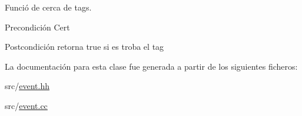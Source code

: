 Funció de cerca de tags. 

\begin{DoxyPrecond}{Precondición}
Cert 
\end{DoxyPrecond}
\begin{DoxyPostcond}{Postcondición}
retorna true si es troba el tag 
\end{DoxyPostcond}


La documentación para esta clase fue generada a partir de los siguientes ficheros\+:\begin{DoxyCompactItemize}
\item 
src/\hyperlink{event_8hh}{event.\+hh}\item 
src/\hyperlink{event_8cc}{event.\+cc}\end{DoxyCompactItemize}
